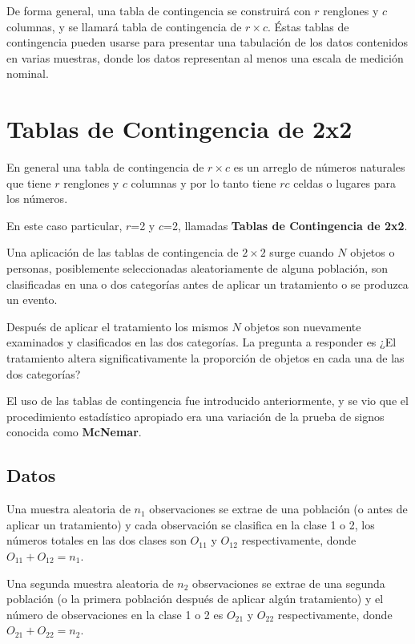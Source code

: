 \documentclass[
  a4paper,
  oneside,
  openany]{book}
\begin{document}
De forma general, una tabla de contingencia se construirá con \(r\) renglones y \(c\) columnas, y se llamará tabla de contingencia de \(r\times c\). Éstas tablas de contingencia pueden usarse para presentar una tabulación de los datos contenidos en varias muestras, donde los datos representan al menos una escala de medición nominal.

\hypertarget{tablas-de-contingencia-de-2x2}{%
\chapter{Tablas de Contingencia de 2x2}\label{tablas-de-contingencia-de-2x2}}

En general una tabla de contingencia de \(r \times c\) es un arreglo de números naturales que tiene \(r\) renglones y \(c\) columnas y por lo tanto tiene \(rc\) celdas o lugares para los números.

En este caso particular, \(r\)=2 y \(c\)=2, llamadas \textbf{Tablas de Contingencia de 2x2}.

Una aplicación de las tablas de contingencia de \(2 \times 2\) surge cuando \(N\) objetos o personas, posiblemente seleccionadas aleatoriamente de alguna población, son clasificadas en una o dos categorías antes de aplicar un tratamiento o se produzca un evento.

Después de aplicar el tratamiento los mismos \(N\) objetos son nuevamente examinados y clasificados en las dos categorías. La pregunta a responder es ¿El tratamiento altera significativamente la proporción de objetos en cada una de las dos categorías?

El uso de las tablas de contingencia fue introducido anteriormente, y se vio que el procedimiento estadístico apropiado era una variación de la prueba de signos conocida como \textbf{McNemar}.

\hypertarget{datos-10}{%
\section{Datos}\label{datos-10}}

Una muestra aleatoria de \(n_{1}\) observaciones se extrae de una población (o antes de aplicar un tratamiento) y cada observación se clasifica en la clase 1 o 2, los números totales en las dos clases son \(O_{11}\) y \(O_{12}\) respectivamente, donde \(O_{11} + O_{12}= n_{1}\).

Una segunda muestra aleatoria de \(n_{2}\) observaciones se extrae de una segunda población (o la primera población después de aplicar algún tratamiento) y el número de observaciones en la clase 1 o 2 es \(O_{21}\) y \(O_{22}\) respectivamente, donde \(O_{21} +O_{22}=n_{2}\).
\end{document}
